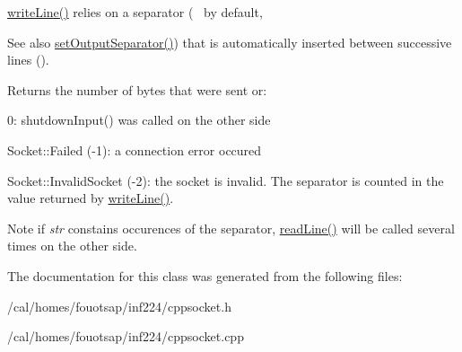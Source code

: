 \hyperlink{classcppu_1_1_socket_buffer_a92ae0351aaee8719d34e8c4618495d59}{write\+Line()} relies on a separator (~\newline
 by default, \begin{DoxySeeAlso}{See also}
\hyperlink{classcppu_1_1_socket_buffer_a0e5e6a9ce3bda28b65c559c8b3c91b0f}{set\+Output\+Separator()}) that is automatically inserted between successive lines ().
\end{DoxySeeAlso}
\begin{DoxyReturn}{Returns}
the number of bytes that were sent or\+:
\begin{DoxyItemize}
\item 0\+: shutdown\+Input() was called on the other side
\item Socket\+::\+Failed (-\/1)\+: a connection error occured
\item Socket\+::\+Invalid\+Socket (-\/2)\+: the socket is invalid. The separator is counted in the value returned by \hyperlink{classcppu_1_1_socket_buffer_a92ae0351aaee8719d34e8c4618495d59}{write\+Line()}.
\end{DoxyItemize}
\end{DoxyReturn}
\begin{DoxyNote}{Note}
if {\itshape str} constains occurences of the separator, \hyperlink{classcppu_1_1_socket_buffer_a222769d3776b9cbd3a727ee1f0e60358}{read\+Line()} will be called several times on the other side. 
\end{DoxyNote}


The documentation for this class was generated from the following files\+:\begin{DoxyCompactItemize}
\item 
/cal/homes/fouotsap/inf224/cppsocket.\+h\item 
/cal/homes/fouotsap/inf224/cppsocket.\+cpp\end{DoxyCompactItemize}
